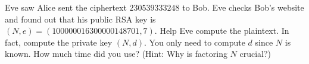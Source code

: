   Eve saw Alice sent the ciphertext $230539333248$ to Bob.
  Eve checks Bob's website and found out that his public RSA key is
  $(N, e) = (100000016300000148701, 7)$.
  Help Eve compute the plaintext.
  In fact, compute the private key $(N, d)$.
  You only need to compute $d$ since $N$ is known.
  How much time did you use?
  (Hint: Why is factoring $N$ crucial?)

